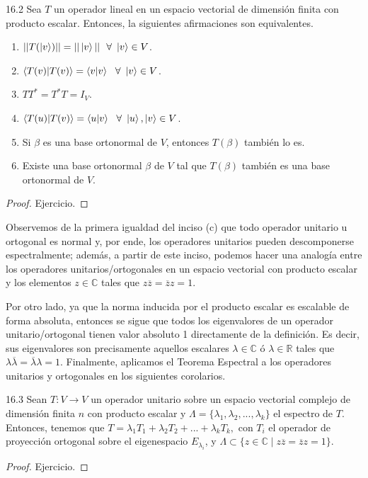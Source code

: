 \documentclass[12pt,libertine]{book}
\begin{document}
\begin{Teo} {16.2}
    Sea $T$ un operador lineal en un espacio vectorial de dimensión finita con producto escalar. Entonces, la siguientes afirmaciones son equivalentes.

    \begin{enumerate}[label=(\alph*)]
        \item $||T(\ket{v})|| = || \ket{v} || \ \ \forall \ \ket{v}\in V$.
        \item $\braket{T(v)|T(v)} = \braket{v|v} \ \ \forall \ \ket{v}\in V$.
        \item $TT^*=T^*T=I_V$.
        \item $\braket{T(u)|T(v)} = \braket{u|v} \ \ \forall \ \ket{u},\ket{v}\in V$.
        \item Si $\beta$ es una base ortonormal de $V$, entonces $T(\beta)$ también lo es.
        \item Existe una base ortonormal $\beta$ de $V$ tal que $T(\beta)$ también es una base ortonormal de $V$.
    \end{enumerate}
\end{Teo}

\begin{proof}
    Ejercicio.
\end{proof}

Observemos de la primera igualdad del inciso (c) que todo operador unitario u ortogonal es normal y, por ende, los operadores unitarios pueden descomponerse espectralmente; además, a partir de este inciso, podemos hacer una analogía entre los operadores unitarios/ortogonales en un espacio vectorial con producto escalar y los elementos $z\in \mathbb{C}$ tales que $z \overline{z} = \overline{z} z = 1$.

\vspace{3mm}
Por otro lado, ya que la norma inducida por el producto escalar es escalable de forma absoluta, entonces se sigue que todos los eigenvalores de un operador unitario/ortogonal tienen valor absoluto 1 directamente de la definición. Es decir, sus eigenvalores son precisamente aquellos escalares $\lambda\in\mathbb{C}$ ó $\lambda\in\mathbb{R}$ tales que $\lambda \overline{\lambda} = \overline{\lambda} \lambda = 1$. Finalmente, aplicamos el Teorema Espectral a los operadores unitarios y ortogonales en los siguientes corolarios.

\begin{Coro} {16.3}
    Sean $T:V\to V$ un operador unitario sobre un espacio vectorial complejo de dimensión finita $n$ con producto escalar y $\Lambda=\{\lambda_1,\lambda_2,... , \lambda_k\}$ el espectro de $T$. Entonces, tenemos que $T = \lambda_1 T_1 + \lambda_2 T_2 + ... + \lambda_k T_k,$ con $T_i$ el operador de proyección ortogonal sobre el eigenespacio $E_{\lambda_i}$, y $\Lambda\subset\{z\in \mathbb{C} \mid z \overline{z}= \overline{z}z = 1\}$.

    \begin{proof}
        Ejercicio.
    \end{proof}
       
\end{Coro}
\end{document}

